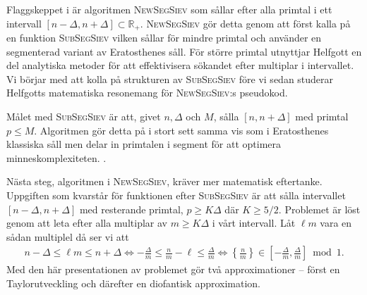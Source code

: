 

Flaggskeppet i \cite{HaraldSieve} är algoritmen \textsc{NewSegSiev} som sållar efter alla primtal i ett intervall \([n - \Delta, n + \Delta] \subset \mathbb{R}_+\). \textsc{NewSegSiev} gör detta genom att först kalla på en funktion \textsc{SubSegSiev} vilken sållar för mindre primtal och använder en segmenterad variant av Eratosthenes såll. För större primtal utnyttjar Helfgott en del analytiska metoder för att effektivisera sökandet efter multiplar i intervallet. Vi börjar med att kolla på strukturen av \textsc{SubSegSiev} före vi sedan studerar Helfgotts matematiska resonemang för \textsc{NewSegSiev}:s pseudokod.

Målet med \textsc{SubSegSiev} är att, givet \(n, \Delta \) och $M$, sålla \([n, n + \Delta]\) med primtal $p \leq M$. Algoritmen gör detta på i stort sett samma vis som i Eratosthenes klassiska såll men delar in primtalen i segment för att optimera minneskomplexiteten. .

Nästa steg, algoritmen i \textsc{NewSegSiev}, kräver mer matematisk eftertanke. Uppgiften som kvarstår för funktionen efter \textsc{SubSegSiev} är att sålla intervallet \([n - \Delta, n + \Delta]\) med resterande primtal, \( p \geq K \Delta\) där \(K \geq 5/2\). Problemet är löst genom att leta efter alla multiplar av \(m \geq K \Delta\) i vårt intervall. Låt \(\ell m\) vara en sådan multiplel då ser vi att
\begin{align} \label{alg.problem}
    n - \Delta \leq \ell m \leq n + \Delta \Longleftrightarrow - \frac{\Delta}{m} \leq \frac{n}{m} - \ell \leq \frac{\Delta}{m} \Longleftrightarrow \left\{ \frac{n}{m} \right\} \in \left[- \frac{\Delta}{m}, \frac{\Delta}{m} \right] \bmod 1.
\end{align}
Med den här presentationen av problemet gör \cite{HaraldSieve} två approximationer -- först en Taylorutveckling och därefter en diofantisk approximation. 

